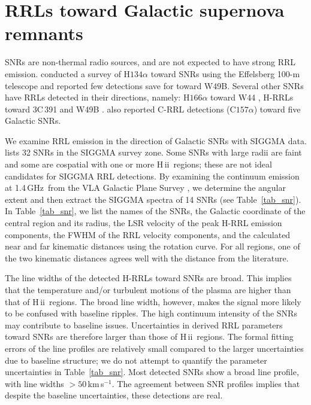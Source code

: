 \documentclass[manuscript]{aastex61}
\newcommand{\hii}{{\rm H\,}{{\sc ii}}}
\newcommand{\kms}{\,km\,s$^{-1}$}
\newcommand{\ghz}{\,GHz}
\begin{document}
\section{RRLs toward Galactic supernova remnants} \label{sec_snr}

SNRs are non-thermal radio sources, and are not expected to have strong RRL emission.
\citet{Downes1974} conducted a survey of H$134\alpha$ toward SNRs using the Effelsberg 100-m telescope and reported few detections save for toward W49B.
Several other SNRs have RRLs detected in their directions, namely: H$166\alpha$ toward W44 \citep{Bignell1973}, H-RRLs toward 3C\,391 and W49B \citep{Cesarsky1973a,Pankonin1975}.
\citet{Cesarsky1976} also reported C-RRL detections (C$157\alpha$) toward five Galactic SNRs.

We examine RRL emission in the direction of Galactic SNRs with SIGGMA data.
\citet[][hereafter the ``Green catalog'']{Green2014} lists 32 SNRs in the SIGGMA survey zone.
Some SNRs with large radii are faint and some are cospatial with one or more \hii\ regions; these are not ideal candidates for SIGGMA RRL detections.
By examining the continuum emission at 1.4\ghz\ from the VLA Galactic Plane Survey \citep[VGPS,][]{Stil2006}, we determine the angular extent and then extract the SIGGMA spectra of 14 SNRs (see Table~\ref{tab_snr}).
In Table~\ref{tab_snr}, we list the names of the SNRs, the Galactic coordinate of the central region and its radius, the LSR velocity of the peak H-RRL emission components, the FWHM of the RRL velocity components, and the calculated near and far kinematic distances using the \citet{Reid2014} rotation curve.
For all regions, one of the two kinematic distances agrees well with the distance from the literature.

The line widths of the detected H-RRLs toward SNRs are broad. 
This implies that the temperature and/or turbulent motions of the plasma are higher than that of \hii\ regions.
The broad line width, however, makes the signal  more likely to be confused with baseline ripples.
The high continuum intensity of the SNRs may contribute to baseline issues. 
Uncertainties in derived RRL parameters toward SNRs are therefore larger than those of \hii\ regions.
The formal fitting errors of the line profiles are relatively small compared to the larger uncertainties due to baseline structure; we do not attempt to quantify the parameter uncertainties in Table~\ref{tab_snr}.
Most detected SNRs show a broad line profile, with line widths $>50$\kms.
The agreement between SNR profiles implies that despite the baseline uncertainties, these detections are real.
\end{document}
